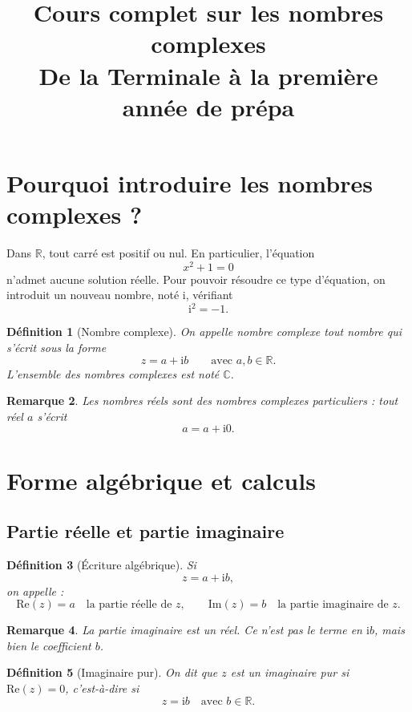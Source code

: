 \documentclass[11pt,a4paper]{article}
\title{\textbf{Cours complet sur les nombres complexes}\\
\large De la Terminale à la première année de prépa}
\author{}
\date{}
\newtheorem{definition}{Définition}[section]
\newtheorem{remarque}[definition]{Remarque}
\newcommand{\R}{\mathbb{R}}
\newcommand{\C}{\mathbb{C}}
\newcommand{\ii}{\mathrm{i}}
\newcommand{\Ree}{\mathrm{Re}}
\newcommand{\Imm}{\mathrm{Im}}
\begin{document}
\maketitle
\tableofcontents
\bigskip

\section{Pourquoi introduire les nombres complexes ?}

Dans $\R$, tout carré est positif ou nul. En particulier, l'équation
\[
x^2+1=0
\]
n'admet aucune solution réelle. Pour pouvoir résoudre ce type d'équation, on introduit un nouveau nombre, noté $\ii$, vérifiant
\[
\ii^2=-1.
\]

\begin{definition}[Nombre complexe]
On appelle \emph{nombre complexe} tout nombre qui s'écrit sous la forme
\[
z=a+\ii b
\qquad \text{avec } a,b\in \R.
\]
L'ensemble des nombres complexes est noté $\C$.
\end{definition}

\begin{remarque}
Les nombres réels sont des nombres complexes particuliers : tout réel $a$ s'écrit
\[
a=a+\ii 0.
\]
\end{remarque}

\section{Forme algébrique et calculs}

\subsection{Partie réelle et partie imaginaire}

\begin{definition}[Écriture algébrique]
Si
\[
z=a+\ii b,
\]
on appelle :
\[
\Ree(z)=a \quad \text{la partie réelle de } z,
\qquad
\Imm(z)=b \quad \text{la partie imaginaire de } z.
\]
\end{definition}

\begin{remarque}
La \emph{partie imaginaire} est un réel. Ce n'est pas le terme en $\ii b$, mais bien le coefficient $b$.
\end{remarque}

\begin{definition}[Imaginaire pur]
On dit que $z$ est un \emph{imaginaire pur} si $\Ree(z)=0$, c'est-à-dire si
\[
z=\ii b \quad \text{avec } b\in \R.
\]
\end{definition}
\end{document}
